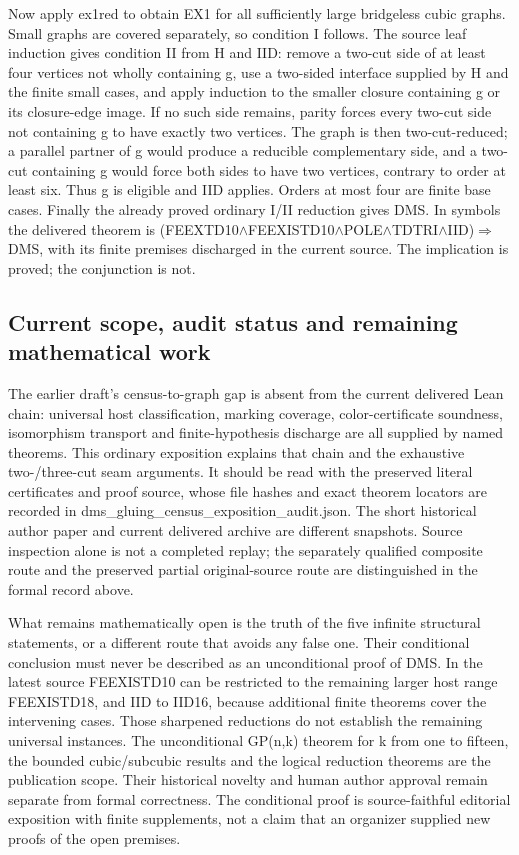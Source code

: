 \documentclass[11pt,a4paper]{article}
\begin{document}
Now apply ex1red to obtain EX1 for all sufficiently large bridgeless cubic graphs. Small graphs are covered separately, so condition I follows. The source leaf induction gives condition II from H and IID: remove a two-cut side of at least four vertices not wholly containing g, use a two-sided interface supplied by H and the finite small cases, and apply induction to the smaller closure containing g or its closure-edge image. If no such side remains, parity forces every two-cut side not containing g to have exactly two vertices. The graph is then two-cut-reduced; a parallel partner of g would produce a reducible complementary side, and a two-cut containing g would force both sides to have two vertices, contrary to order at least six. Thus g is eligible and IID applies. Orders at most four are finite base cases. Finally the already proved ordinary I/II reduction gives DMS. In symbols the delivered theorem is (FEEXTD10\ensuremath{\wedge}FEEXISTD10\ensuremath{\wedge}POLE\ensuremath{\wedge}TDTRI\ensuremath{\wedge}IID)\ensuremath{\Rightarrow}DMS, with its finite premises discharged in the current source. The implication is proved; the conjunction is not.

\subsection{Current scope, audit status and remaining mathematical work}
The earlier draft's census-to-graph gap is absent from the current delivered Lean chain: universal host classification, marking coverage, color-certificate soundness, isomorphism transport and finite-hypothesis discharge are all supplied by named theorems. This ordinary exposition explains that chain and the exhaustive two-/three-cut seam arguments. It should be read with the preserved literal certificates and proof source, whose file hashes and exact theorem locators are recorded in dms\_gluing\_census\_exposition\_audit.json. The short historical author paper and current delivered archive are different snapshots. Source inspection alone is not a completed replay; the separately qualified composite route and the preserved partial original-source route are distinguished in the formal record above.

What remains mathematically open is the truth of the five infinite structural statements, or a different route that avoids any false one. Their conditional conclusion must never be described as an unconditional proof of DMS. In the latest source FEEXISTD10 can be restricted to the remaining larger host range FEEXISTD18, and IID to IID16, because additional finite theorems cover the intervening cases. Those sharpened reductions do not establish the remaining universal instances. The unconditional GP(n,k) theorem for k from one to fifteen, the bounded cubic/subcubic results and the logical reduction theorems are the publication scope. Their historical novelty and human author approval remain separate from formal correctness. The conditional proof is source-faithful editorial exposition with finite supplements, not a claim that an organizer supplied new proofs of the open premises.
\end{document}

